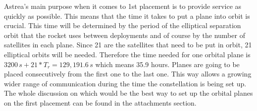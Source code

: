 \newline\newline
Astrea's main purpose when it comes to 1st placement is to provide service as quickly as possible. This means that the time it takes to put a plane into orbit is crucial. This time will be determined by the period of the elliptical separation orbit that the rocket uses between deployments and of course by the number of satellites in each plane. Since 21 are the satellites that need to be put in orbit, 21 elliptical orbits will be needed. Therefore the time needed for one orbital plane is $3200\,s + 21*T_r = 129,191.6\,s$ which means 35.9 hours.
Planes are going to be placed consecutively from the first one to the last one. This way allows a growing wider range of communication during the time the constellation is being set up. The whole discussion on which would be the best way to set up the orbital planes on the first placement can be found in the attachments section.





